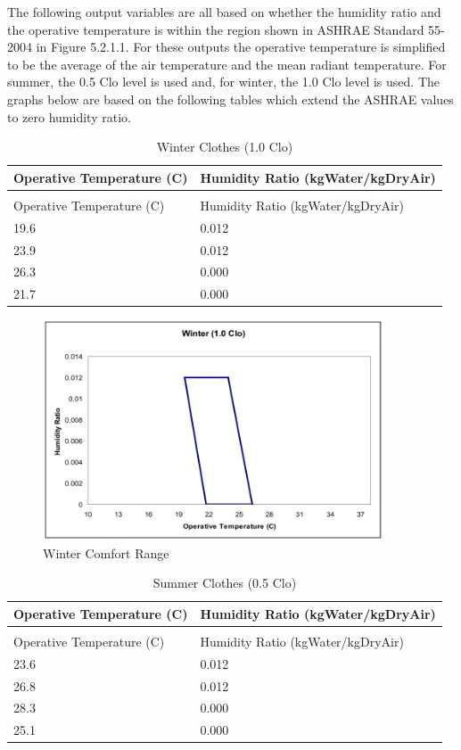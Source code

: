 The following output variables are all based on whether the humidity ratio and the operative temperature is within the region shown in ASHRAE Standard 55-2004 in Figure 5.2.1.1. For these outputs the operative temperature is simplified to be the average of the air temperature and the mean radiant temperature. For summer, the 0.5 Clo level is used and, for winter, the 1.0 Clo level is used. The graphs below are based on the following tables which extend the ASHRAE values to zero humidity ratio.

\begin{longtable}[c]{@{}ll@{}}
\caption{Winter Clothes (1.0 Clo) \label{table:winter-clothes-1.0-clo}} \tabularnewline
\toprule
Operative Temperature (C) & Humidity Ratio (kgWater/kgDryAir) \tabularnewline
\midrule
\endfirsthead

\caption[]{Winter Clothes (1.0 Clo)} \tabularnewline
\toprule
Operative Temperature (C) & Humidity Ratio (kgWater/kgDryAir) \tabularnewline
\midrule
\endhead

19.6 & 0.012 \tabularnewline
23.9 & 0.012 \tabularnewline
26.3 & 0.000 \tabularnewline
21.7 & 0.000 \tabularnewline
\bottomrule
\end{longtable}

\begin{figure}[hbtp] %
\centering
\includegraphics[width=0.9\textwidth, height=0.9\textheight, keepaspectratio=true]{media/image084.png}
\caption{Winter Comfort Range \protect \label{fig:winter-comfort-range}}
\end{figure}

\begin{longtable}[c]{@{}ll@{}}
\caption{Summer Clothes (0.5 Clo) \label{table:summer-clothes-0.5-clo}} \tabularnewline
\toprule
Operative Temperature (C) & Humidity Ratio (kgWater/kgDryAir) \tabularnewline
\midrule
\endfirsthead

\caption[]{Summer Clothes (0.5 Clo)} \tabularnewline
\toprule
Operative Temperature (C) & Humidity Ratio (kgWater/kgDryAir) \tabularnewline
\midrule
\endhead

23.6 & 0.012 \tabularnewline
26.8 & 0.012 \tabularnewline
28.3 & 0.000 \tabularnewline
25.1 & 0.000 \tabularnewline
\bottomrule
\end{longtable}

